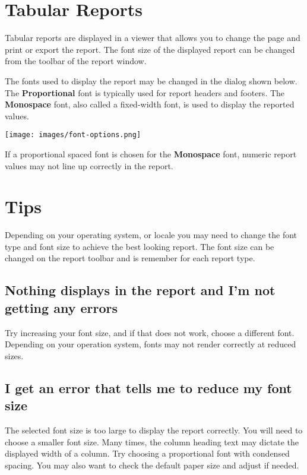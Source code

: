 \documentclass[letterpaper,12pt]{book}
\begin{document}
    \section{Tabular Reports}
    Tabular reports are displayed in a viewer that allows you to change the page and print or export the report.
    The font size of the displayed report can be changed from the toolbar of the report window.

    The fonts used to display the report may be changed in the 
    dialog shown below. The \textbf{Proportional} font is typically used for report headers and footers.
    The \textbf{ Monospace} font, also called a fixed-width font, is used to display the reported values.

    \texttt{[image: images/font-options.png]}

    If a proportional spaced font is chosen for the \textbf{ Monospace} font, numeric report values may not line up
    correctly in the report.


    \section{Tips}
    Depending on your operating system, or locale you may need to change the font type and font size to achieve
    the best looking report.
    The font size can be changed on the report toolbar and is remember for each report type.

    \subsection{Nothing displays in the report and I'm not getting any errors}
    Try increasing your font size, and if that does not work, choose a different font.
    Depending on your operation system, fonts may not render correctly at reduced sizes.

    \subsection{I get an error that tells me to reduce my font size}
    The selected font size is too large to display the report correctly.
    You will need to choose a smaller font size.
    Many times, the column heading text may dictate the displayed width of a column.
    Try choosing a proportional font with condensed spacing.
    You may also want to check the default paper size and adjust if needed.
\end{document}
